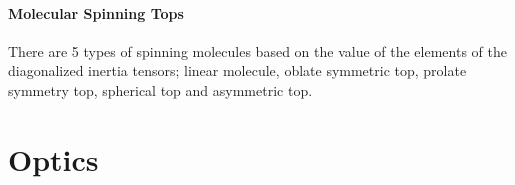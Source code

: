 \documentclass[11pt,a4paper]{book}
\begin{document}
			\label{subsec:Group Representation}
			
			\label{subsec:Rotational Transitions}
			
			\label{subsec:Statistical Distribution}
			
		\subsection{Molecular Spinning Tops}	
			\label{subsec:Molecular Spinning Tops}
			There are 5 types of spinning molecules based on the value of the elements of the diagonalized inertia tensors; linear molecule, oblate symmetric top, prolate symmetry top, spherical top and asymmetric top.
			
\part{Optics}
\end{document}
